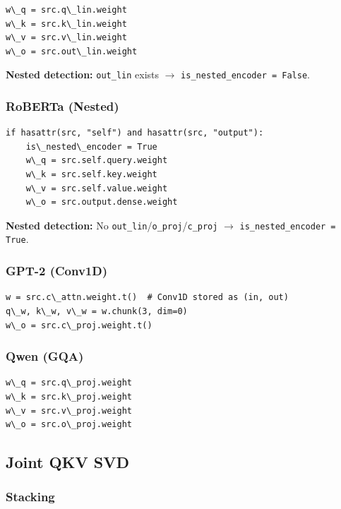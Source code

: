 \begin{lstlisting}
w\_q = src.q\_lin.weight
w\_k = src.k\_lin.weight
w\_v = src.v\_lin.weight
w\_o = src.out\_lin.weight
\end{lstlisting}

\textbf{Nested detection:} \texttt{out\_lin} exists $\to$ \texttt{is\_nested\_encoder = False}.

\subsubsection{RoBERTa (Nested)}

\begin{lstlisting}
if hasattr(src, "self") and hasattr(src, "output"):
    is\_nested\_encoder = True
    w\_q = src.self.query.weight
    w\_k = src.self.key.weight
    w\_v = src.self.value.weight
    w\_o = src.output.dense.weight
\end{lstlisting}

\textbf{Nested detection:} No \texttt{out\_lin}/\texttt{o\_proj}/\texttt{c\_proj} $\to$ \texttt{is\_nested\_encoder = True}.

\subsubsection{GPT-2 (Conv1D)}

\begin{lstlisting}
w = src.c\_attn.weight.t()  # Conv1D stored as (in, out)
q\_w, k\_w, v\_w = w.chunk(3, dim=0)
w\_o = src.c\_proj.weight.t()
\end{lstlisting}

\subsubsection{Qwen (GQA)}

\begin{lstlisting}
w\_q = src.q\_proj.weight
w\_k = src.k\_proj.weight
w\_v = src.v\_proj.weight
w\_o = src.o\_proj.weight
\end{lstlisting}

\subsection{Joint QKV SVD}

\subsubsection{Stacking}

